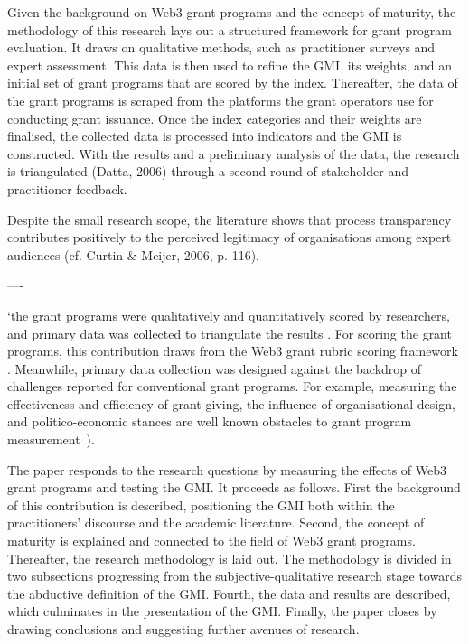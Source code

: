 \documentclass[conference]{IEEEtran}
\begin{document}
Given the background on Web3 grant programs and the concept of maturity, the methodology of this research lays out a structured framework for grant program evaluation. It draws on qualitative methods, such as practitioner surveys and expert assessment. This data is then used to refine the GMI, its weights, and an initial set of grant programs that are scored by the index. Thereafter, the data of the grant programs is scraped from the platforms the grant operators use for conducting grant issuance. Once the index categories and their weights are finalised, the collected data is processed into indicators and the GMI is constructed. With the results and a preliminary analysis of the data, the research is triangulated (Datta, 2006) through a second round of stakeholder and practitioner feedback.

Despite the small research scope, the literature shows that process transparency contributes positively to the perceived legitimacy of organisations among expert audiences (cf. Curtin \& Meijer, 2006, p. 116).



----



`the grant programs were qualitatively and quantitatively scored by researchers, and primary data was collected to triangulate the results \cite{creswell_designing_2017,datta_paradigm_2006}. For scoring the grant programs, this contribution draws from the Web3 grant rubric scoring framework \cite{biedermann_evaluating_2024}. Meanwhile, primary data collection was designed against the backdrop of challenges reported for conventional grant programs. For example, measuring the effectiveness and efficiency of grant giving, the influence of organisational design, and politico-economic stances are well known obstacles to grant program measurement~\cite{lerner_government_2000}).



The paper responds to the research questions by measuring the effects of Web3 grant programs and testing the GMI. It proceeds as follows. First the background of this contribution is described, positioning the GMI both within the practitioners’ discourse and the academic literature. Second, the concept of maturity is explained and connected to the field of Web3 grant programs. Thereafter, the research methodology is laid out. The methodology is divided in two subsections progressing from the subjective-qualitative research stage towards the abductive definition of the GMI. Fourth, the data and results are described, which culminates in the presentation of the GMI. Finally, the paper closes by drawing conclusions and suggesting further avenues of research.
\end{document}
